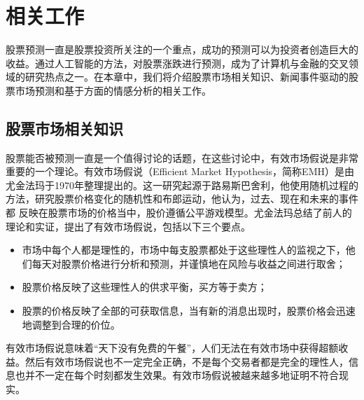 \chapter{相关工作}
\label{cha:relatedwork}

股票预测一直是股票投资所关注的一个重点，成功的预测可以为投资者创造巨大的收益。通过人工智能的方法，对股票涨跌进行预测，成为了计算机与金融的交叉领域的研究热点之一。在本章中，我们将介绍股票市场相关知识、新闻事件驱动的股票市场预测和基于方面的情感分析的相关工作。
\section{股票市场相关知识}
股票能否被预测一直是一个值得讨论的话题，在这些讨论中，有效市场假说是非常重要的一个理论。有效市场假说（Efficient Market Hypothesis，简称EMH）是由尤金法玛于1970年整理提出的\cite{fama1970efficient}。这一研究起源于路易斯巴舍利，他使用随机过程的方法，研究股票价格变化的随机性和布郎运动，他认为，过去、现在和未来的事件都 反映在股票市场的价格当中，股价遵循公平游戏模型。尤金法玛总结了前人的理论和实证，提出了有效市场假说，包括以下三个要点。
\begin{itemize}
    \item 市场中每个人都是理性的，市场中每支股票都处于这些理性人的监视之下，他们每天对股票价格进行分析和预测，并谨慎地在风险与收益之间进行取舍；
    \item 股票价格反映了这些理性人的供求平衡，买方等于卖方；
    \item 股票的价格反映了全部的可获取信息，当有新的消息出现时，股票价格会迅速地调整到合理的价位。
\end{itemize}
有效市场假说意味着“天下没有免费的午餐”，人们无法在有效市场中获得超额收益。然后有效市场假说也不一定完全正确，不是每个交易者都是完全的理性人，信息也并不一定在每个时刻都发生效果。有效市场假说被越来越多地证明不符合现实。

